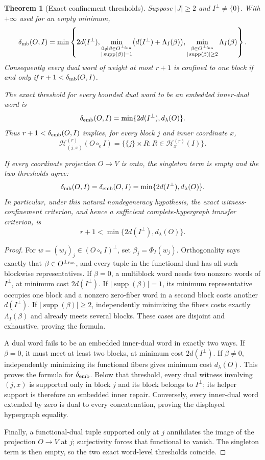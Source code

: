 \documentclass[11pt]{article}
\newtheorem{theorem}{Theorem}[section]
\theoremstyle{definition}
\theoremstyle{remark}
\newcommand{\cH}{\mathcal{H}}
\newcommand{\supp}{\operatorname{supp}}
\begin{document}
\begin{theorem}[Exact confinement thresholds]\label{thm:weighted-transfer}
Suppose $|J|\geq2$ and $I^\perp\ne\{0\}$.  With $+\infty$ used for an empty minimum,
\[
\delta_{\rm mb}(O,I)=\min\left\{
 2d(I^\perp),
 \min_{\substack{0\ne\beta\in O^{\perp_{\rm fun}}\\
                  |\supp(\beta)|=1}}
       \bigl(d(I^\perp)+\Lambda_I(\beta)\bigr),
 \min_{\substack{\beta\in O^{\perp_{\rm fun}}\\
                  |\supp(\beta)|\geq2}}
       \Lambda_I(\beta)
 \right\}.
\]
Consequently every dual word of weight at most $r+1$ is confined to one
block if and only if $r+1<\delta_{\rm mb}(O,I)$.

The exact threshold for every bounded dual word to be an embedded
inner-dual word is
\[
 \delta_{\rm emb}(O,I)=\min\{2d(I^\perp),d_\lambda(O)\}.
\]
Thus $r+1<\delta_{\rm emb}(O,I)$ implies, for every block $j$ and inner
coordinate $x$,
\[
 \cH_{(j,x)}^{(r)}(O\circ_e I)
 =\{\{j\}\times R:R\in\cH_x^{(r)}(I)\}.
\]

If every coordinate projection $O\to V$ is onto, the singleton term is
empty and the two thresholds agree:
\[
 \delta_{\rm mb}(O,I)=\delta_{\rm emb}(O,I)
 =\min\{2d(I^\perp),d_\lambda(O)\}.
\]
In particular, under this natural nondegeneracy hypothesis, the exact
witness-confinement criterion, and hence a sufficient complete-hypergraph
transfer criterion, is
\[
 r+1<\min\{2d(I^\perp),d_\lambda(O)\}.
\]
\end{theorem}

\begin{proof}
For $w=(w_j)_j\in(O\circ_e I)^\perp$, set
$\beta_j=\Phi_I(w_j)$.  Orthogonality says exactly that
$\beta\in O^{\perp_{\rm fun}}$, and every tuple in the functional dual has
all such blockwise representatives.  If $\beta=0$, a multiblock word needs
two nonzero words of $I^\perp$, at minimum cost $2d(I^\perp)$.  If
$|\supp(\beta)|=1$, its minimum representative occupies one block and a
nonzero zero-fiber word in a second block costs another $d(I^\perp)$.  If
$|\supp(\beta)|\geq2$, independently minimizing the fibers costs exactly
$\Lambda_I(\beta)$ and already meets several blocks.  These cases are
disjoint and exhaustive, proving the formula.

A dual word fails to be an embedded inner-dual word in exactly two ways.  If
$\beta=0$, it must meet at least two blocks, at minimum cost
$2d(I^\perp)$.  If $\beta\ne0$, independently minimizing its functional
fibers gives minimum cost $d_\lambda(O)$.  This proves the formula for
$\delta_{\rm emb}$.  Below that threshold, every dual witness involving
$(j,x)$ is supported only in block $j$ and its block belongs to $I^\perp$;
its helper support is therefore an embedded inner repair.  Conversely, every
inner-dual word extended by zero is dual to every concatenation, proving the
displayed hypergraph equality.

Finally, a functional-dual tuple supported only at $j$ annihilates the image
of the projection $O\to V$ at $j$; surjectivity forces that functional to
vanish.  The singleton term is then empty, so the two exact word-level
thresholds coincide.
\end{proof}
\end{document}
